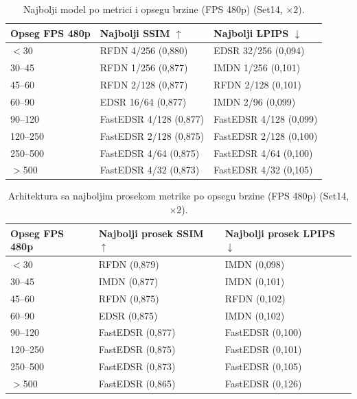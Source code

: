 
\begin{table}[H]
    \centering
    \caption{Najbolji model po metrici i opsegu brzine (FPS 480p) (Set14, $\times2$).}
    \label{tab:fps_bins_best_model_2x_Set14}
    \small
    \setlength{\tabcolsep}{4pt}
    \begin{tabular}{@{}lll@{}}
        \toprule
        Opseg FPS 480p & Najbolji SSIM $\uparrow$ & Najbolji LPIPS $\downarrow$ \\
        \midrule
        $<$30 & RFDN 4/256 (0,880) & EDSR 32/256 (0,094) \\
        30--45 & RFDN 1/256 (0,877) & IMDN 1/256 (0,101) \\
        45--60 & RFDN 2/128 (0,877) & RFDN 2/128 (0,101) \\
        60--90 & EDSR 16/64 (0,877) & IMDN 2/96 (0,099) \\
        90--120 & FastEDSR 4/128 (0,877) & FastEDSR 4/128 (0,099) \\
        120--250 & FastEDSR 2/128 (0,875) & FastEDSR 2/128 (0,100) \\
        250--500 & FastEDSR 4/64 (0,875) & FastEDSR 4/64 (0,100) \\
        $>$500 & FastEDSR 4/32 (0,873) & FastEDSR 4/32 (0,105) \\
        \bottomrule
    \end{tabular}
\end{table}

\begin{table}[H]
    \centering
    \caption{Arhitektura sa najboljim prosekom metrike po opsegu brzine (FPS 480p) (Set14, $\times2$).}
    \label{tab:fps_bins_best_arch_2x_Set14}
    \small
    \setlength{\tabcolsep}{4pt}
    \begin{tabular}{@{}lll@{}}
        \toprule
        Opseg FPS 480p & Najbolji prosek SSIM $\uparrow$ & Najbolji prosek LPIPS $\downarrow$ \\
        \midrule
        $<$30 & RFDN (0,879) & IMDN (0,098) \\
        30--45 & IMDN (0,877) & IMDN (0,101) \\
        45--60 & RFDN (0,875) & RFDN (0,102) \\
        60--90 & EDSR (0,875) & IMDN (0,102) \\
        90--120 & FastEDSR (0,877) & FastEDSR (0,100) \\
        120--250 & FastEDSR (0,875) & FastEDSR (0,101) \\
        250--500 & FastEDSR (0,873) & FastEDSR (0,105) \\
        $>$500 & FastEDSR (0,865) & FastEDSR (0,126) \\
        \bottomrule
    \end{tabular}
\end{table}

